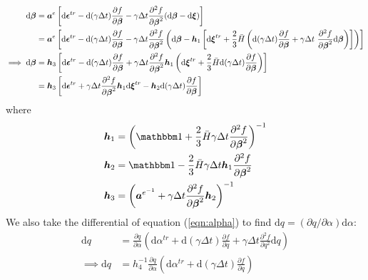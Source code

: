 \documentclass[10pt]{article}
\begin{document}
\begin{equation}
\begin{aligned}
\mathrm{d}\mbox{\boldmath$\beta$} &= \mbox{\boldmath$ a$}^e
\left[
 \mathrm{d}\mbox{\boldmath$\epsilon$}^{tr}
- \mathrm{d}(\gamma\Delta t)
\frac{\partial f}{\partial \mbox{\boldmath$\beta$}}
-\gamma\Delta t
\frac{\partial^2 f}{\partial \mbox{\boldmath$\beta$}^2}
(\mathrm{d}\mbox{\boldmath$\beta$}
- \mathrm{d}\mbox{\boldmath$\xi$})\right]\\
&= \mbox{\boldmath$ a$}^e
\left[
 \mathrm{d}\mbox{\boldmath$\epsilon$}^{tr}
- \mathrm{d}(\gamma\Delta t)
\frac{\partial f}{\partial \mbox{\boldmath$\beta$}}
-\gamma\Delta t
\frac{\partial^2 f}{\partial \mbox{\boldmath$\beta$}^2}
\left(\mathrm{d}\mbox{\boldmath$\beta$}
-
\mbox{\boldmath$ h$}_1
\left[
\mathrm{d}\mbox{\boldmath$\xi$}^{tr} +
\frac{2}{3}\bar{H}\left(
\mathrm{d}(\gamma\Delta t)\frac{\partial f}{\partial\mbox{\boldmath$\beta$}}
+
\gamma\Delta t\
\frac{\partial^2 f}{\partial\mbox{\boldmath$\beta$}^2}
\mathrm{d}\mbox{\boldmath$\beta$}
\right)\right]
\right)\right]\\
\implies
\mathrm{d}\mbox{\boldmath$\beta$}
&=
\mbox{\boldmath$ h$}_3
\left[
 \mathrm{d}\mbox{\boldmath$\epsilon$}^{tr}
- \mathrm{d}(\gamma\Delta t)
\frac{\partial f}{\partial \mbox{\boldmath$\beta$}}
+\gamma\Delta t
\frac{\partial^2 f}{\partial \mbox{\boldmath$\beta$}^2}
\mbox{\boldmath$ h$}_1
\left(
\mathrm{d}\mbox{\boldmath$\xi$}^{tr} +
\frac{2}{3}\bar{H}
\mathrm{d}(\gamma\Delta t)\frac{\partial f}{\partial\mbox{\boldmath$\beta$}}
\right)
\right]\\
&=
\mbox{\boldmath$ h$}_3
\left[
 \mathrm{d}\mbox{\boldmath$\epsilon$}^{tr}
 +\gamma\Delta t
\frac{\partial^2 f}{\partial \mbox{\boldmath$\beta$}^2}
\mbox{\boldmath$ h$}_1
\mathrm{d}\mbox{\boldmath$\xi$}^{tr}
- \mbox{\boldmath$ h$}_2
\mathrm{d}(\gamma\Delta t)\frac{\partial f}{\partial\mbox{\boldmath$\beta$}}
\right]
\label{eqn:dbeta2}
\end{aligned}
\end{equation}
where
\begin{equation}
\begin{aligned}
\bh_1 &=\left(\iso + \frac{2}{3}\bar{H}\gamma\Delta t\frac{\partial^2 f}{\partial\Bbeta^2}\right)^{-1}\\
\bh_2 &=\iso - \frac{2}{3}\bar{H}\gamma\Delta t\bh_1\frac{\partial^2 f}{\partial\Bbeta^2}\\
\bh_3 &=\left(\ba^{e^{-1}} +\gamma\Delta t\frac{\partial^2 f}{\partial \Bbeta^2}\bh_2\right)^{-1}
\end{aligned}
\end{equation}
We also take the differential of equation (\ref{eqn:alpha}) to find $\mathrm{d}q = (\partial q/\partial \alpha)\mathrm{d}\alpha$:
\begin{equation}
\begin{aligned}
\mathrm{d}q &= \frac{\partial q}{\partial \alpha}\left(
\mathrm{d}\alpha^{tr} + \mathrm{d}(\gamma\Delta t)
\frac{\partial f}{\partial q}
+ \gamma\Delta t \frac{\partial^2 f}{\partial q^2}\mathrm{d}q
\right)\\
\implies \mathrm{d}q &=h_4^{-1}
{\frac{\partial q}{\partial \alpha}\left(
\mathrm{d}\alpha^{tr} + \mathrm{d}(\gamma\Delta t)
\frac{\partial f}{\partial q}\right)}
\end{aligned}
\end{equation}
\end{document}
